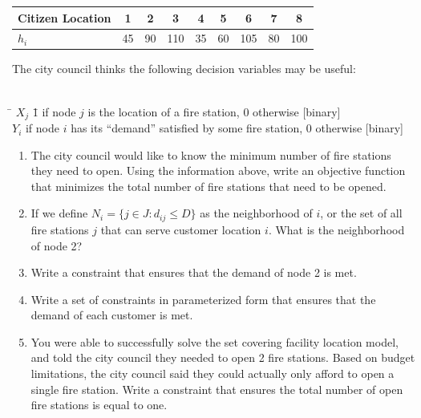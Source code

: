 \documentclass[letterpaper,oneside,12pt]{article}%
\begin{document}
\begin{enumerate}
\vspace{0.25cm}

\begin{tabular}{l|c|c|c|c|c|c|c|c|}
Citizen Location &  1	&	2	&	3	&	4	&
5	&	6	&	7	&	8	
\\
\hline
$h_i$ & 45	&	90	&	110	&	35	&	60	&	105	&	80	&	100	
\end{tabular}

\vspace{.5cm}

\noindent The city council thinks the following decision variables may be useful:
\begin{tabbing}
\\[0.2cm]
\hspace*{.5cm} \= $X_j$ \hspace{1cm} \= 1 if node $j$ is the location of a fire station, 0 otherwise  [binary] \\
\> $Y_{i}$  if node $i$ has its ``demand'' satisfied by some fire station, 0 otherwise  [binary] \\ 
\end{tabbing}



\begin{enumerate}
\item The city council would like to know the minimum number of fire stations they need to open.  Using the information above, write an objective function that minimizes the total number of fire stations that need to be opened.


\item If we define $N_i = \{ j \in J: d_{ij} \leq D \}$ as the neighborhood of $i$, or the set of all fire stations $j$ that can serve customer location $i$.  What is the neighborhood of node 2?


\item  Write a constraint that ensures that the demand of node 2 is met.  

\item  Write a set of constraints in parameterized form that ensures that the demand of each customer is met.


\item  You were able to successfully solve the set covering facility location model, and told the city council they needed to open 2 fire stations.  Based on budget limitations, the city council said they could actually only afford to open a single fire station.  Write a constraint that ensures the total number of open fire stations is equal to one.


\end{enumerate}
\end{enumerate}
\end{document}
